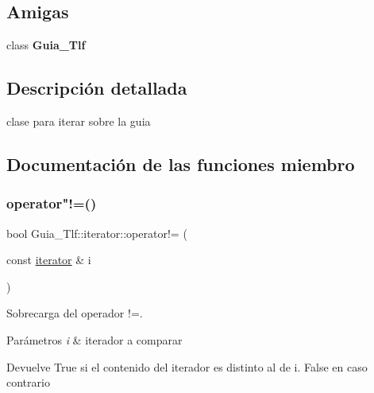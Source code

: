 \subsection*{Amigas}
\begin{DoxyCompactItemize}
\item 
\mbox{\label{classGuia__Tlf_1_1iterator_a4349d7a1b26a0aa94447235f95b2f940}} 
class {\bfseries Guia\+\_\+\+Tlf}
\end{DoxyCompactItemize}


\subsection{Descripción detallada}
clase para iterar sobre la guia 

\subsection{Documentación de las funciones miembro}
\mbox{\label{classGuia__Tlf_1_1iterator_aa7f7981ca6aec075d47618b136904682}} 
\subsubsection{\texorpdfstring{operator"!=()}{operator!=()}}
{\footnotesize\ttfamily bool Guia\+\_\+\+Tlf\+::iterator\+::operator!= (\begin{DoxyParamCaption}\item[{const \hyperlink{classGuia__Tlf_1_1iterator}{iterator} \&}]{i }\end{DoxyParamCaption})}



Sobrecarga del operador !=. 


\begin{DoxyParams}{Parámetros}
{\em i} & iterador a comparar \\
\hline
\end{DoxyParams}
\begin{DoxyReturn}{Devuelve}
True si el contenido del iterador es distinto al de i. False en caso contrario 
\end{DoxyReturn}
\mbox{\label{classGuia__Tlf_1_1iterator_a677ada958ed6f7f65c29f2d12b6e35b6}} 
